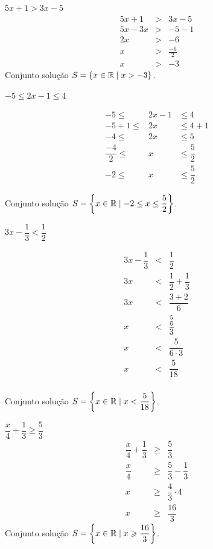   \begin{exem} 
  $5x +1 > 3x - 5$
  \begin{eqnarray*}
  5x +1 &>& 3x - 5 \\
  5x - 3x &>& -5 - 1 \\
  2x &>& -6 \\
  x &>& \frac{-6}{2} \\
  x &>& -3
  \end{eqnarray*}
  Conjunto solução $S=\{x \in \mathbb{R} \mid x > -3\}$.
 \end{exem}
 
  \begin{exem} 
  $-5 \leq 2x - 1 \leq 4$
   
   \begin{eqnarray*}
    -5  \leq  & 2x - 1 & \leq  4 \\
  -5 + 1 \leq & 2x & \leq 4 + 1 \\
  -4 \leq & 2x & \leq 5 \\
   \dfrac{-4}{2} \leq & x & \leq \dfrac{5}{2} \\
  -2 \leq & x &  \leq \dfrac{5}{2} 
   \end{eqnarray*}
      
  Conjunto solução $S= \left\{x \in \mathbb{R} \mid -2 \leq x \leq \dfrac{5}{2} \right\}$.
 \end{exem}
 
 \begin{exem} 
 $3x - \dfrac{1}{3} < \dfrac{1}{2}$
 
 \begin{eqnarray*}
  3x - \dfrac{1}{3} &<& \dfrac{1}{2} \\
  3x  &<& \dfrac{1}{2} + \dfrac{1}{3} \\
  3x  &<& \dfrac{3 + 2}{6} \\
  x  &<& \dfrac{\frac{5}{6}}{3} \\
  x  &<& \dfrac{5}{6 \cdot 3} \\
  x  &<& \dfrac{5}{18} \\
  \end{eqnarray*}
  
  Conjunto solução $S= \left\{x \in \mathbb{R} \mid x < \dfrac{5}{18} \right\}$.
 \end{exem}
 
  \begin{exem} 
 $\dfrac{x}{4} + \dfrac{1}{3} \geqslant \dfrac{5}{3}$
 \begin{eqnarray*}
  \dfrac{x}{4} + \dfrac{1}{3} & \geqslant & \dfrac{5}{3} \\
  \dfrac{x}{4} & \geqslant & \dfrac{5}{3} - \dfrac{1}{3} \\
  x & \geqslant & \dfrac{4}{3} \cdot 4 \\
  x & \geqslant & \dfrac{16}{3}
  \end{eqnarray*}
  Conjunto solução $S= \left\{x \in \mathbb{R} \mid x \geqslant \dfrac{16}{3} \right\}$.
 \end{exem}
 
